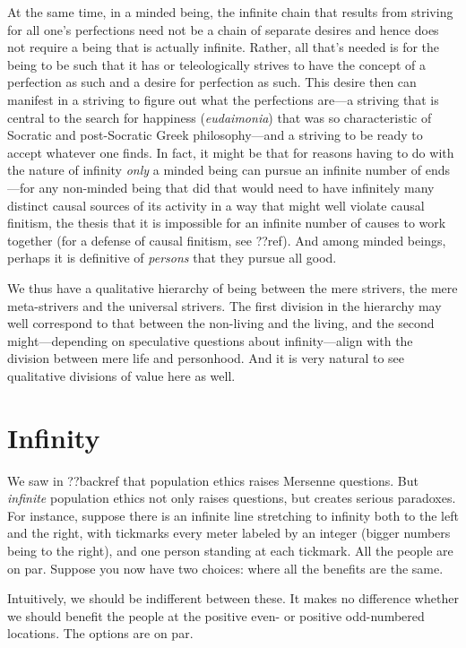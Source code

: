 At the same time, in a minded being, the infinite chain that results from striving for all one's perfections need not be a chain of separate desires
and hence does not require a being that is actually infinite. Rather, all that's needed is for the being to be such that it has or teleologically strives
to have the concept of a perfection as such and a desire for perfection as such. This desire then can manifest in a striving to figure out what the perfections are---a striving that is central to
the search for happiness (\textit{eudaimonia}) that was so characteristic of Socratic and post-Socratic Greek philosophy---and a striving to be ready
to accept whatever one finds. In fact, it might be that for reasons having to do with the nature of infinity \textit{only} a minded being can pursue
an infinite number of ends---for any non-minded being that did that would need to have infinitely many distinct causal sources of its activity in
a way that might well violate causal finitism, the thesis that it is impossible for an infinite number of causes to work together (for a defense
of causal finitism, see ??ref). And among minded beings, perhaps it is definitive of \textit{persons} that they pursue all good.

We thus have a qualitative hierarchy of being between the mere strivers, the mere meta-strivers and the universal strivers. The first division in
the hierarchy may well correspond to that between the non-living and the living, and the second might---depending on speculative questions about
infinity---align with the division between mere life and personhood. And it is very natural to see qualitative divisions of value here as well.

\section{Infinity}
We saw in ??backref that population ethics raises Mersenne questions. But \textit{infinite} population 
ethics not only raises questions, but creates serious paradoxes. For instance, suppose there is an 
infinite line stretching to infinity both to the left and the right, with tickmarks every meter 
labeled by an integer (bigger numbers being to the right), and one person standing at each tickmark. 
All the people are on par. Suppose you now have two 
choices:
where all the benefits are the same.

Intuitively, we should be indifferent between these. It makes no difference whether we should benefit the 
people at the positive even- or positive odd-numbered locations. The options are on par. 

